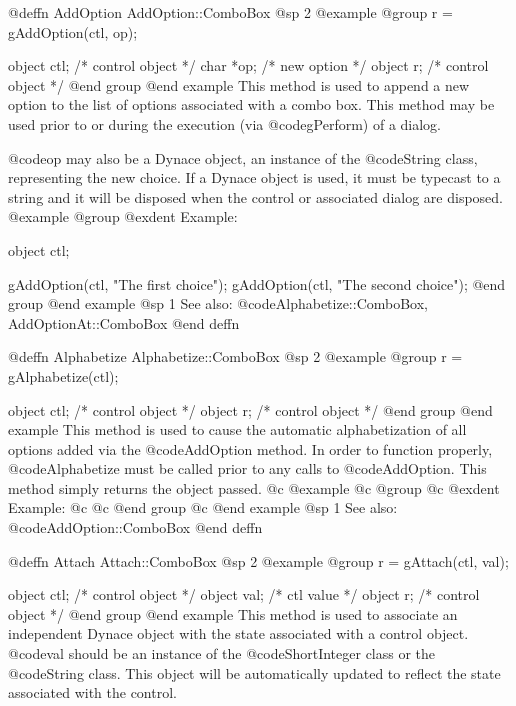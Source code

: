 @deffn {AddOption} AddOption::ComboBox
@sp 2
@example
@group
r = gAddOption(ctl, op);

object  ctl;    /*  control object  */
char    *op;    /*  new option      */
object  r;      /*  control object  */
@end group
@end example
This method is used to append a new option to the list of options associated
with a combo box.  This method may be used prior to or during the execution
(via @code{gPerform}) of a dialog.

@code{op} may also be a Dynace object, an instance of the @code{String}
class, representing the new choice.  If a Dynace object is used, it must
be typecast to a string and it will be disposed when the control or
associated dialog are disposed.
@example
@group
@exdent Example:

object  ctl;

gAddOption(ctl, "The first choice");
gAddOption(ctl, "The second choice");
@end group
@end example
@sp 1
See also:  @code{Alphabetize::ComboBox, AddOptionAt::ComboBox}
@end deffn












@deffn {Alphabetize} Alphabetize::ComboBox
@sp 2
@example
@group
r = gAlphabetize(ctl);

object  ctl;    /*  control object  */
object  r;      /*  control object  */
@end group
@end example
This method is used to cause the automatic alphabetization of all
options added via the @code{AddOption} method.  In order to function
properly, @code{Alphabetize} must be called prior to any calls to
@code{AddOption}.  This method simply returns the object passed.
@c @example
@c @group
@c @exdent Example:
@c 
@c @end group
@c @end example
@sp 1
See also:  @code{AddOption::ComboBox}
@end deffn












@deffn {Attach} Attach::ComboBox
@sp 2
@example
@group
r = gAttach(ctl, val);

object  ctl;   /*  control object  */
object  val;   /*  ctl value       */
object  r;     /*  control object  */
@end group
@end example
This method is used to associate an independent Dynace object with the
state associated with a control object.  @code{val} should be an
instance of the @code{ShortInteger} class or the @code{String} class.
This object will be automatically updated to reflect the state
associated with the control.

